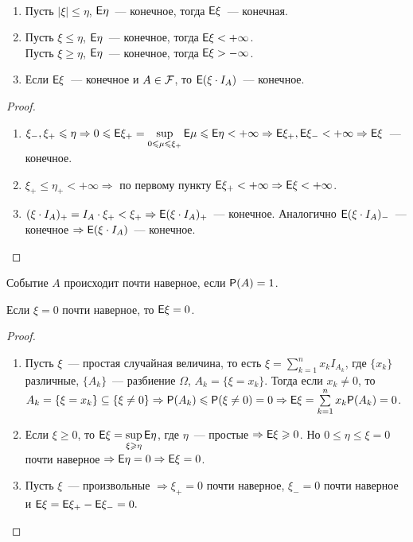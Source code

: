 \begin{property}~

	\begin{enumerate}
		\item Пусть $|\xi| \leqslant \eta$, $\E\eta$~--- конечное, тогда $\E \xi$~--- конечная.
		\item Пусть $\xi \leqslant \eta$, $\E\eta$~--- конечное, тогда $\E\xi < + \infty$. \\
		Пусть $\xi \geqslant \eta$, $\E\eta$~--- конечное, тогда $\E\xi > - \infty$.
		\item Если $\E\xi$~--- конечное и $A \in \F$, то $\E(\xi\cdot I_A)$~--- конечное.
	\end{enumerate}
	\begin{proof}
		\begin{enumerate}
			\item $\xi_-, \xi_+ \leqslant \eta \Rightarrow 0 \leqslant \E\xi_+ = \sup\limits_{0 \leqslant \mu \leqslant \xi_+}\E\mu \leqslant \E\eta < +\infty \Rightarrow \E\xi_+, \E\xi_- < +\infty \Rightarrow \E\xi$~--- конечное.
			\item $\xi_+ \leqslant \eta_+ < +\infty \Rightarrow$ по первому пункту $\E\xi_+ < +\infty \Rightarrow \E\xi < +\infty$.
			\item $(\xi\cdot I_A)_+ = I_A\cdot\xi_+ < \xi_+ \Rightarrow \E(\xi\cdot I_A)_+$~--- конечное. Аналогично $\E(\xi\cdot I_A)_-$~--- конечное $\Rightarrow \E(\xi\cdot I_A)$~--- конечное.
		\end{enumerate}
	\end{proof}
\end{property}

\begin{definition}
	Событие $A$ происходит почти наверное, если $\P(A) = 1$.
\end{definition}

\begin{property}
	Если $\xi = 0$ почти наверное, то $\E\xi = 0$.
	\begin{proof}
	    \begin{enumerate}
	    \item Пусть $\xi$~--- простая случайная величина, то есть $\xi = \sum\limits_{k = 1}^nx_kI_{A_k}$, где $\{x_k\}$ различные, $\{A_k\}$~--- разбиение $\Omega$, $A_k = \{\xi = x_k\}$. Тогда если $x_k \neq 0$, то $A_k = \{\xi = x_k\} \subseteq \{\xi \neq 0\} \Rightarrow \P(A_k) \leqslant \P(\xi \neq 0) = 0 \Rightarrow \E\xi = \sum\limits_{k = 1}^n x_k\P(A_k) = 0$. 
	    
	    \item Если $\xi \geqslant 0$, то $\E\xi = \sup\limits_{\xi \geqslant \eta} \E\eta$, где $\eta$~--- простые $\Rightarrow \E\xi \geqslant 0$. Но $0 \leqslant \eta \leqslant \xi = 0$ почти наверное $\Rightarrow \E\eta = 0 \Rightarrow \E\xi = 0$. 
	    
	    \item Пусть $\xi$~--- произвольные $\Rightarrow \xi_+ = 0$ почти наверное, $\xi_- = 0$ почти наверное и $\E\xi = \E\xi_+ - \E\xi_- = 0.$
	    \end{enumerate}
	\end{proof} 
\end{property}


